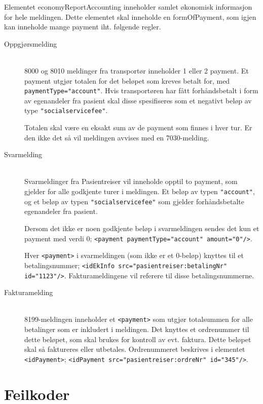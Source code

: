 \documentclass[a4paper,titlepage,norsk,11pt]{article}
\begin{document}
Elementet economyReportAccounting inneholder samlet økonomisk informasjon for hele meldingen. Dette elementet skal inneholde en formOfPayment, som igjen kan inneholde mange payment iht. følgende regler.

\begin{description}

  \item[Oppgjørsmelding] \hfill \\
  8000 og 8010 meldinger fra transportør inneholder 1 eller 2 payment. Et payment utgjør totalen for det beløpet som kreves betalt for, med \lstinline{paymentType="account"}. Hvis transportøren har fått forhåndsbetalt i form av egenandeler fra pasient skal disse spesifiseres som et negativt beløp av type \lstinline{"socialservicefee"}.

  Totalen skal være en eksakt sum av de payment som finnes i hver tur. Er den ikke det så vil meldingen avvises med en 7030-melding.

  \item[Svarmelding] \hfill \\
  Svarmeldinger fra Pasientreiser vil inneholde opptil to payment, som gjelder for alle godkjente turer i meldingen. Et beløp av typen \lstinline{"account"}, og et beløp av typen \lstinline{"socialservicefee"} som gjelder forhåndsbetalte egenandeler fra pasient.

  Dersom det ikke er noen godkjente beløp i svarmeldingen sendes det kun et payment med verdi 0; \lstinline{<payment paymentType="account" amount="0"/>}.

  Hver \lstinline{<payment>} i svarmeldingen (som ikke er et 0-beløp) knyttes til et betalingsnummer; \lstinline{<idEkInfo src="pasientreiser:betalingNr" id="1123"/>}. Fakturameldingene vil referere til disse betalingsnummerne.

	\item[Fakturamelding] \hfill \\
	8199-meldingen inneholder et \lstinline{<payment>} som utgjør totalsummen for alle betalinger som er inkludert i meldingen. Det knyttes et ordrenummer til dette beløpet, som skal brukes for kontroll av evt. faktura. Dette beløpet skal så faktureres eller utbetales. Ordrenummeret beskrives i elementet \lstinline{<idPayment>}; \lstinline{<idPayment src="pasientreiser:ordreNr" id="345"/>}.

\end{description}

\section{Feilkoder}
\end{document}

